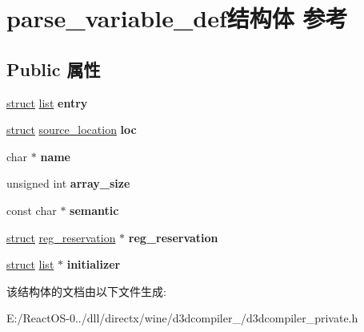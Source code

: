 \hypertarget{structparse__variable__def}{}\section{parse\+\_\+variable\+\_\+def结构体 参考}
\label{structparse__variable__def}
\subsection*{Public 属性}
\begin{DoxyCompactItemize}
\item 
\mbox{\label{structparse__variable__def_ab93459386105516d4387652c26a6b10f}} 
\hyperlink{interfacestruct}{struct} \hyperlink{classlist}{list} {\bfseries entry}
\item 
\mbox{\label{structparse__variable__def_a6d1ce20cb0dd047c252e0f6e8eb6ff16}} 
\hyperlink{interfacestruct}{struct} \hyperlink{structsource__location}{source\+\_\+location} {\bfseries loc}
\item 
\mbox{\label{structparse__variable__def_aa9cdada8194691d27d792f29753a4de0}} 
char $\ast$ {\bfseries name}
\item 
\mbox{\label{structparse__variable__def_a3ff64ea43d81f8e77c1ea5e2355c781a}} 
unsigned int {\bfseries array\+\_\+size}
\item 
\mbox{\label{structparse__variable__def_a54f940761627cf2ca238ecd6301fb917}} 
const char $\ast$ {\bfseries semantic}
\item 
\mbox{\label{structparse__variable__def_aa8ad3236220b3753b1e50c4ccb1aba2e}} 
\hyperlink{interfacestruct}{struct} \hyperlink{structreg__reservation}{reg\+\_\+reservation} $\ast$ {\bfseries reg\+\_\+reservation}
\item 
\mbox{\label{structparse__variable__def_a12db4cab96e1d1ff46c4eb8a3855657c}} 
\hyperlink{interfacestruct}{struct} \hyperlink{classlist}{list} $\ast$ {\bfseries initializer}
\end{DoxyCompactItemize}


该结构体的文档由以下文件生成\+:\begin{DoxyCompactItemize}
\item 
E\+:/\+React\+O\+S-\/0../dll/directx/wine/d3dcompiler\+\_/d3dcompiler\+\_\+private.\+h\end{DoxyCompactItemize}
